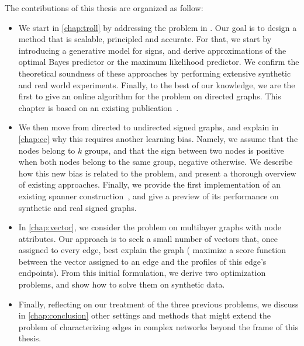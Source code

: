 The contributions of this thesis are organized as follow:

\begin{itemize}

  \item We start in \autoref{chap:troll} by addressing the \esp{} problem in \dssn{}. Our goal is to
    design a method that is scalable, principled and accurate. For that, we start by introducing a
    generative model for signs, and derive approximations of the optimal Bayes predictor or the
    maximum likelihood predictor. We confirm the theoretical soundness of these approaches by
    performing extensive synthetic and real world experiments. Finally, to the best of our
    knowledge, we are the first to give an online algorithm for the \esp{} problem on directed
    graphs. This chapter is based on an existing publication~\autocite{trollSign17}.

  \item We then move from directed to undirected signed graphs, and explain in \autoref{chap:cc} why
    this requires another learning bias. Namely, we assume that the nodes belong to $k$ groups, and
    that the sign between two nodes is positive when both nodes belong to the same group, negative
    otherwise. We describe how this new bias is related to the \pcc{} problem, and present a
    thorough overview of existing approaches. Finally, we provide the first implementation of an
    existing spanner construction~\autocite{gtxFabio}, and give a preview of its performance on
    synthetic and real signed graphs.

 \item In \autoref{chap:vector}, we consider the \ecp{} problem on multilayer graphs with node
   attributes. Our approach is to seek a small number of vectors that, once assigned to every edge,
   best explain the graph (\ie{} maximize a score function between the vector assigned to an edge
   and the profiles of this edge's endpoints). From this initial formulation, we derive two
   optimization problems, and show how to solve them on synthetic data.

  \item Finally, reflecting on our treatment of the three previous problems, we discuss in
    \autoref{chap:conclusion} other settings and methods that might extend the problem of
    characterizing edges in complex networks beyond the frame of this thesis.

\end{itemize}
